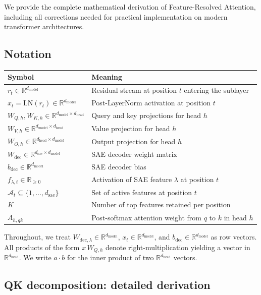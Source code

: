 \documentclass{article}
\theoremstyle{plain}
\theoremstyle{definition}
\theoremstyle{remark}
\newcommand{\Wdec}{W_{\mathrm{dec}}}
\newcommand{\dmodel}{d_{\mathrm{model}}}
\newcommand{\dhead}{d_{\mathrm{head}}}
\newcommand{\dsae}{d_{\mathrm{sae}}}
\newcommand{\RR}{\mathbb{R}}
\begin{document}
We provide the complete mathematical derivation of Feature-Resolved Attention, including all corrections needed for practical implementation on modern transformer architectures.

\subsection{Notation}

\begin{table}[h]
\centering
\begin{tabular}{ll}
\toprule
Symbol & Meaning \\
\midrule
$r_t \in \RR^{\dmodel}$ & Residual stream at position $t$ entering the sublayer \\
$x_t = \mathrm{LN}(r_t) \in \RR^{\dmodel}$ & Post-LayerNorm activation at position $t$ \\
$W_{Q,h}, W_{K,h} \in \RR^{\dmodel \times \dhead}$ & Query and key projections for head $h$ \\
$W_{V,h} \in \RR^{\dmodel \times \dhead}$ & Value projection for head $h$ \\
$W_{O,h} \in \RR^{\dhead \times \dmodel}$ & Output projection for head $h$ \\
$\Wdec \in \RR^{\dsae \times \dmodel}$ & SAE decoder weight matrix \\
$b_{\mathrm{dec}} \in \RR^{\dmodel}$ & SAE decoder bias \\
$f_{\lambda,t} \in \RR_{\geq 0}$ & Activation of SAE feature $\lambda$ at position $t$ \\
$\mathcal{A}_t \subseteq \{1, \ldots, \dsae\}$ & Set of active features at position $t$ \\
$K$ & Number of top features retained per position \\
$A_{h,qk}$ & Post-softmax attention weight from $q$ to $k$ in head $h$ \\
\bottomrule
\end{tabular}
\end{table}

Throughout, we treat $W_{\mathrm{dec},\lambda} \in \RR^{\dmodel}$, $x_t \in \RR^{\dmodel}$, and $b_{\mathrm{dec}} \in \RR^{\dmodel}$ as row vectors. All products of the form $x\,W_{Q,h}$ denote right-multiplication yielding a vector in $\RR^{\dhead}$. We write $a \cdot b$ for the inner product of two $\RR^{\dhead}$ vectors.

\subsection{QK decomposition: detailed derivation}
\label{app:qk_derivation}
\end{document}
